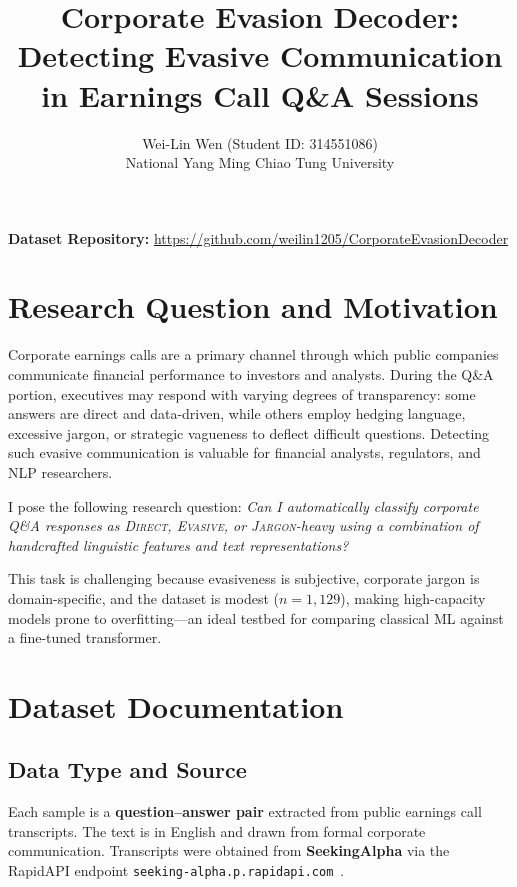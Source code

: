 \documentclass[12pt]{article}
\title{
    \textbf{Corporate Evasion Decoder: Detecting Evasive Communication in
    Earnings Call Q\&A Sessions}
}
\author{
    Wei-Lin Wen (Student ID: 314551086)\\[2pt]
    National Yang Ming Chiao Tung University
}
\date{}
\begin{document}
\maketitle
\thispagestyle{empty}

\noindent\textbf{Dataset Repository:}
\url{https://github.com/weilin1205/CorporateEvasionDecoder}

\section{Research Question and Motivation}

Corporate earnings calls are a primary channel through which public companies
communicate financial performance to investors and analysts. During the Q\&A
portion, executives may respond with varying degrees of transparency: some
answers are direct and data-driven, while others employ hedging language,
excessive jargon, or strategic vagueness to deflect difficult questions.
Detecting such evasive communication is valuable for financial analysts,
regulators, and NLP researchers.

I pose the following research question: \emph{Can I automatically classify
corporate Q\&A responses as \textsc{Direct}, \textsc{Evasive}, or
\textsc{Jargon}-heavy using a combination of handcrafted linguistic features
and text representations?}

This task is challenging because evasiveness is subjective, corporate
jargon is domain-specific, and the dataset is modest ($n = 1{,}129$),
making high-capacity models prone to overfitting---an ideal testbed
for comparing classical ML against a fine-tuned transformer.

\section{Dataset Documentation}

\subsection{Data Type and Source}

Each sample is a \textbf{question--answer pair} extracted from public earnings
call transcripts. The text is in English and drawn from formal corporate
communication. Transcripts were obtained from \textbf{SeekingAlpha}
via the RapidAPI endpoint
\texttt{seeking-alpha.p.rapidapi.com}~\cite{seekingalpha}.
\end{document}
